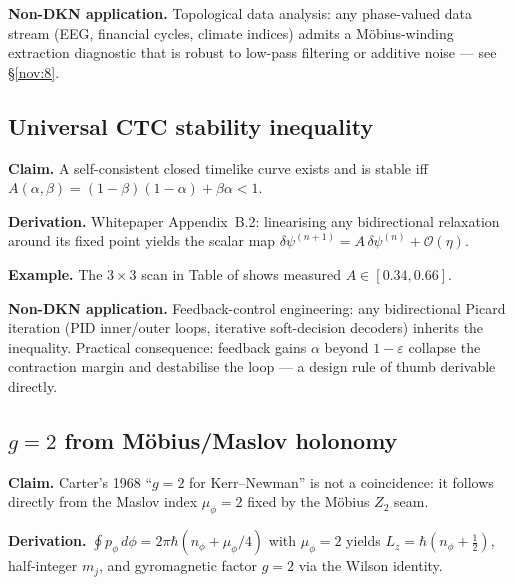 \documentclass[11pt,a4paper]{article}
\theoremstyle{definition}
\newcommand{\contr}{A}
\begin{document}
\begin{tcolorbox}[applbox]
\textbf{Non-DKN application.}
Topological data analysis: any phase-valued data stream (EEG,
financial cycles, climate indices) admits a Möbius-winding extraction
diagnostic that is robust to low-pass filtering or additive noise
--- see \S\ref{nov:8}.
\end{tcolorbox}

\subsection{Universal CTC stability inequality}\label{nov:5}

\begin{tcolorbox}[noveltybox]
\textbf{Claim.} A self-consistent closed timelike curve exists and is
stable iff $\contr(\alpha,\beta) = (1-\beta)(1-\alpha)+\beta\alpha < 1$.
\end{tcolorbox}

\textbf{Derivation.} Whitepaper Appendix~B.2: linearising any
bidirectional relaxation around its fixed point yields the scalar map
$\delta\psi^{(n+1)} = \contr \,\delta\psi^{(n)} + \mathcal{O}(\eta)$.

\textbf{Example.} The $3\times 3$ scan in Table of
\cite{Knopp2026TemporalLoop} shows measured $\contr \in [0.34, 0.66]$.

\begin{tcolorbox}[applbox]
\textbf{Non-DKN application.}
Feedback-control engineering: any bidirectional Picard iteration (PID
inner/outer loops, iterative soft-decision decoders) inherits the
inequality. Practical consequence: feedback gains $\alpha$ beyond
$1-\varepsilon$ collapse the contraction margin and destabilise the
loop --- a design rule of thumb derivable directly.
\end{tcolorbox}

\subsection{$g = 2$ from M\"obius/Maslov holonomy}\label{nov:6}

\begin{tcolorbox}[noveltybox]
\textbf{Claim.} Carter's 1968 ``$g{=}2$ for Kerr--Newman'' is not a
coincidence: it follows directly from the Maslov index $\mu_\phi = 2$
fixed by the M\"obius $Z_2$ seam.
\end{tcolorbox}

\textbf{Derivation.} $\oint p_\phi\,d\phi = 2\pi\hbar(n_\phi + \mu_\phi/4)$
with $\mu_\phi = 2$ yields $L_z = \hbar(n_\phi + \tfrac12)$, half-integer
$m_j$, and gyromagnetic factor $g = 2$ via the Wilson identity.
\end{document}
